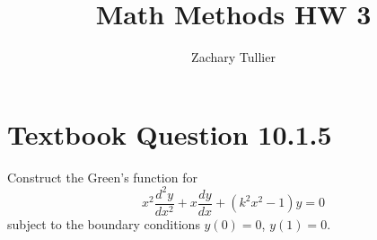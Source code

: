 \documentclass[12pt]{article}
\begin{document}
\singlespacing  %
\title{Math Methods HW 3}

\author[1]{Zachary Tullier}
\date{}
\maketitle




\section*{Textbook Question 10.1.5}
    Construct the Green's function for 
    \[
        x^2 \frac{d^2y}{dx^2} + x \frac{dy}{dx} + (k^2 x^2 - 1)y = 0
    \]
    subject to the boundary conditions $y(0) = 0$, $y(1) = 0$.
\end{document}
